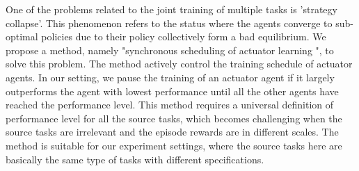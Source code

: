 One of the problems related to the joint training of multiple tasks is 'strategy collapse'. This phenomenon refers to the status where the agents converge to sub-optimal policies due to their policy collectively form a bad equilibrium. We propose a method, namely "synchronous scheduling of actuator learning ", to solve this problem. The method actively control the training schedule of actuator agents. In our setting, we pause the training of an actuator agent if it largely outperforms the agent with lowest performance until all the other agents have reached the performance level. This method requires a universal definition of performance level for all the source tasks, which becomes challenging when the source tasks are irrelevant and the episode rewards are in different scales. The method is suitable for our experiment settings, where the source tasks here are basically the same type of tasks with different specifications.

